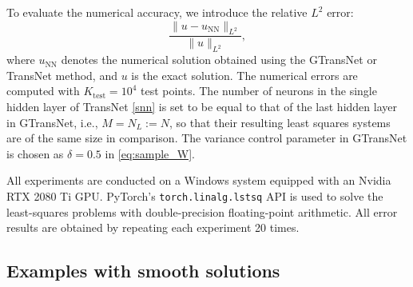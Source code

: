 \documentclass{article}
\begin{document}
To evaluate the numerical accuracy, we introduce the relative \(L^2\) error:
\[
\frac{\|u - u_{\mathrm{NN}}\|_{L^2}}{\|u\|_{L^2}},
\]
where \(u_{\mathrm{NN}}\) denotes the numerical solution obtained using the GTransNet or TransNet method, and \(u\) is the exact solution. 
The numerical errors are computed with  \(K_{\mathrm{test}} = 10^4\) test points. The number of neurons in the single hidden layer of TransNet \eqref{snn} is set to be equal to that of the last hidden layer in GTransNet, i.e., \(M=N_L:=N\), so that their resulting least squares systems  are of the same size in  comparison. The variance control parameter in GTransNet is chosen as  $\delta = 0.5$ in \eqref{eq:sample_W}.

All experiments are conducted on a Windows system equipped with an Nvidia RTX 2080 Ti GPU. PyTorch’s \verb|torch.linalg.lstsq| API is used to solve the least-squares problems with double-precision floating-point arithmetic. All error results are obtained by repeating each experiment 20 times.

\subsection{Examples with smooth solutions}\label{sexp}
\end{document}
